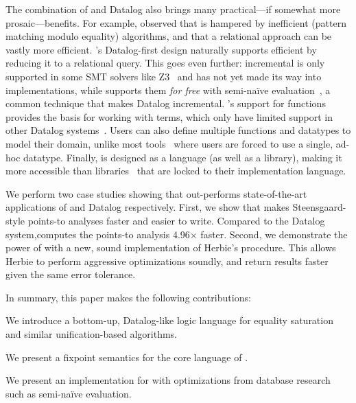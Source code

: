 The combination of \eqsat and Datalog
 also brings many practical---if somewhat more prosaic---benefits.
For example,
 \citet{relational-ematching}
 observed that \eqsat is hampered by inefficient
 \ematching (pattern matching modulo equality) algorithms,
 and that a relational approach can be vastly more efficient.
\egglog's Datalog-first design naturally 
 supports efficient \ematching by reducing it to a relational query.
This goes even further:
incremental \ematching is only supported in some SMT solvers like Z3~\cite{z3}
 and has not yet made its way into \eqsat implementations,
 while \egglog supports them \emph{for free} with semi-na\"ive evaluation~\citep{seminaive},
 a common technique that makes Datalog incremental.
\egglog's support for functions
 provides the basis for working with terms,
 which only have limited support in other Datalog systems~\cite{souffle-adt}.
Users can also define multiple
 functions and datatypes
 to model their domain,
 unlike most \eqsat tools~\cite{egg,metatheory.jl}
 where users are forced to use a single, ad-hoc datatype.
Finally,
 \egglog is designed as a language (as well as a library),
 making it more accessible
 than \eqsat libraries~\cite{egg,metatheory.jl} 
 that are locked to their implementation language.

We perform two case studies showing that \egglog out-performs 
  state-of-the-art applications of \eqsat and Datalog respectively.
First, we show that \egglog makes Steensgaard-style points-to analyses
  faster and easier to write.
Compared to the \souffle Datalog system,\xspace \egglog computes the points-to analysis
  4.96$\times$ faster.
Second, we demonstrate the power of \egglog
 with a new, sound implementation of Herbie's \eqsat procedure.
This allows Herbie to perform aggressive optimizations soundly,
  and return results faster given the same error tolerance.


In summary, this paper makes the following contributions:
\begin{compactitem}
  \item We introduce a bottom-up, Datalog-like logic language 
   for equality saturation and similar unification-based algorithms.
  \item We present a fixpoint semantics for the core language of \egglog.
  \item We present an implementation for \egglog with optimizations 
   from database research such as semi-na\"ive evaluation.
\end{compactitem}

